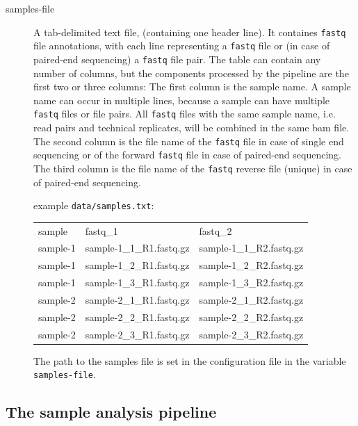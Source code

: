 \documentclass[a4paper]{article}
\begin{document}
\begin{description}

\item[samples-file] A tab-delimited text file, (containing one header
  line). It containes \texttt{fastq} file annotations, with each line
  representing a \texttt{fastq} file or (in case of paired-end
  sequencing) a \texttt{fastq} file pair. The table can contain any
  number of columns, but the components processed by the pipeline are
  the first two or three columns: The first column is the sample
  name. A sample name can occur in multiple lines, because a sample
  can have multiple \texttt{fastq} files or file pairs. All
  \texttt{fastq} files with the same sample name, i.e. read pairs and
  technical replicates, will be combined in the same bam file. The
  second column is the file name of the \texttt{fastq} file in case of
  single end sequencing or of the forward \texttt{fastq} file in case
  of paired-end sequencing. The third column is the file name of the
  \texttt{fastq} reverse file (unique) in case of paired-end
  sequencing.

  example \texttt{data/samples.txt}:

  {\scriptsize
    {\ttfamily
      \begin{tabular}{lll}
        
        sample & fastq\_1 & fastq\_2 \\
        sample-1 & sample-1\_1\_R1.fastq.gz & sample-1\_1\_R2.fastq.gz \\
        sample-1 & sample-1\_2\_R1.fastq.gz & sample-1\_2\_R2.fastq.gz \\
        sample-1 & sample-1\_3\_R1.fastq.gz & sample-1\_3\_R2.fastq.gz \\
        sample-2 & sample-2\_1\_R1.fastq.gz & sample-2\_1\_R2.fastq.gz \\
        sample-2 & sample-2\_2\_R1.fastq.gz & sample-2\_2\_R2.fastq.gz \\
        sample-2 & sample-2\_3\_R1.fastq.gz & sample-2\_3\_R2.fastq.gz \\

      \end{tabular}
    }
  }

  The path to the samples file is set in the configuration file in the
  variable \texttt{samples-file}.

\end{description}

\subsection{The sample analysis pipeline}
\label{sec:sample-analys-pipel-1}
\end{document}
